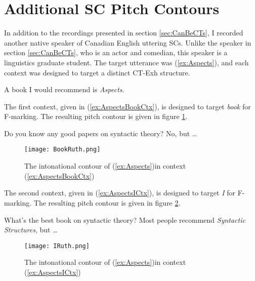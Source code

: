 \documentclass[
]{RCL}
\begin{document}
\appendix
\section{Additional SC Pitch Contours}\label{sec:append}
In addition to the recordings presented in section \ref{sec:CanBeCTs}, I recorded another native speaker of Canadian English uttering SCs.
Unlike the speaker in section \ref{sec:CanBeCTs}, who is an actor and comedian, this speaker is a linguistics graduate student.
The target utterance was (\ref{ex:Aspects}), and each context was designed to target a distinct CT-Exh structure.
\begin{exe}
	\ex\label{ex:Aspects} A book I would recommend is \textit{Aspects}.
\end{exe}

The first context, given in (\ref{ex:AspectsBookCtx}), is designed to target \textit{book} for F-marking.
The resulting pitch contour is given in figure \ref{fig:BookRuth}.
\begin{exe}
\ex \label{ex:AspectsBookCtx}
	\begin{xlist}
		 Do you know any good papers on syntactic theory?
		 No, but \dots
	\end{xlist}	
\end{exe}

\begin{figure}[h]
	\centering
	\texttt{[image: BookRuth.png]}
	\caption{The intonational contour of (\ref{ex:Aspects})in context (\ref{ex:AspectsBookCtx})}
	\label{fig:BookRuth}
\end{figure}
\FloatBarrier

The second context, given in (\ref{ex:AspectsICtx}), is designed to target \textit{I} for F-marking.
The resulting pitch contour is given in figure \ref{fig:IRuth}.
\begin{exe}
\ex\label{ex:AspectsICtx}
\begin{xlist}
	 What’s the best book on syntactic theory?
	 Most people recommend \textit{Syntactic Structures}, but \dots
\end{xlist}	
\end{exe}

\begin{figure}[h]
	\centering
	\texttt{[image: IRuth.png]}
	\caption{The intonational contour of (\ref{ex:Aspects})in context (\ref{ex:AspectsICtx})}
	\label{fig:IRuth}
\end{figure}
\FloatBarrier
\end{document}
